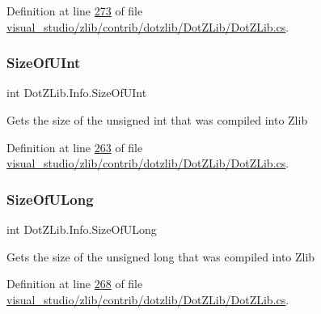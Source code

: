Definition at line \hyperlink{visual__studio_2zlib_2contrib_2dotzlib_2_dot_z_lib_2_dot_z_lib_8cs_source_l00273}{273} of file \hyperlink{visual__studio_2zlib_2contrib_2dotzlib_2_dot_z_lib_2_dot_z_lib_8cs_source}{visual\+\_\+studio/zlib/contrib/dotzlib/\+Dot\+Z\+Lib/\+Dot\+Z\+Lib.\+cs}.

\mbox{\label{class_dot_z_lib_1_1_info_aea3a993ab00cb3b89aa4c3efc3b3adcb}} 
\subsubsection{\texorpdfstring{Size\+Of\+U\+Int}{SizeOfUInt}}
{\footnotesize\ttfamily int Dot\+Z\+Lib.\+Info.\+Size\+Of\+U\+Int\hspace{0.3cm}{\ttfamily [get]}}



Gets the size of the unsigned int that was compiled into Zlib 



Definition at line \hyperlink{visual__studio_2zlib_2contrib_2dotzlib_2_dot_z_lib_2_dot_z_lib_8cs_source_l00263}{263} of file \hyperlink{visual__studio_2zlib_2contrib_2dotzlib_2_dot_z_lib_2_dot_z_lib_8cs_source}{visual\+\_\+studio/zlib/contrib/dotzlib/\+Dot\+Z\+Lib/\+Dot\+Z\+Lib.\+cs}.

\mbox{\label{class_dot_z_lib_1_1_info_a0a6d4a4c79e2b30388a5161f31d9a9ad}} 
\subsubsection{\texorpdfstring{Size\+Of\+U\+Long}{SizeOfULong}}
{\footnotesize\ttfamily int Dot\+Z\+Lib.\+Info.\+Size\+Of\+U\+Long\hspace{0.3cm}{\ttfamily [get]}}



Gets the size of the unsigned long that was compiled into Zlib 



Definition at line \hyperlink{visual__studio_2zlib_2contrib_2dotzlib_2_dot_z_lib_2_dot_z_lib_8cs_source_l00268}{268} of file \hyperlink{visual__studio_2zlib_2contrib_2dotzlib_2_dot_z_lib_2_dot_z_lib_8cs_source}{visual\+\_\+studio/zlib/contrib/dotzlib/\+Dot\+Z\+Lib/\+Dot\+Z\+Lib.\+cs}.

